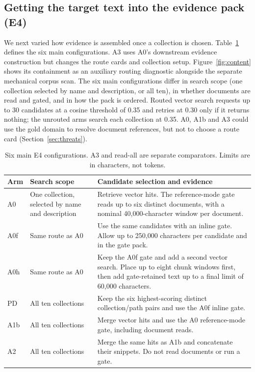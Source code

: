 \subsection{Getting the target text into the evidence pack (E4)}
\label{sec:ladder-opt}
\label{sec:exp-e4}
We next varied how evidence is assembled once a collection is chosen.
Table~\ref{tab:ablation-configs} defines the six main configurations.
A3 uses A0's downstream evidence construction but changes the route cards
and collection setup. Figure~\ref{fig:content} shows its containment as an
auxiliary routing diagnostic alongside the separate mechanical corpus scan.
The six main configurations differ
in search scope (one collection selected by name and description, or all
ten), in whether documents are read and gated, and in how the pack is
ordered. Routed vector search requests up to 30 candidates at a cosine
threshold of 0.35 and retries at 0.30 only if it returns nothing; the
unrouted arms search each collection at 0.35. A0, A1b and A3 could use
the gold domain to resolve document references, but not to choose a route card
(Section~\ref{sec:threats}).

\begin{table}[!ht]
\centering
\small
\setlength{\tabcolsep}{3pt}
\renewcommand{\arraystretch}{1.16}
\caption{Six main E4 configurations. A3 and read-all are separate
comparators. Limits are in characters, not tokens.}
\label{tab:ablation-configs}
\begin{tabular}{@{}l>{\raggedright\arraybackslash}p{}>{\raggedright\arraybackslash}p{}@{}}
\toprule
Arm & Search scope & Candidate selection and evidence\\
\midrule
A0 & One collection, selected by name and description & Retrieve vector hits. The reference-mode gate reads up to six distinct documents, with a nominal 40{,}000-character window per document.\\
A0f & Same route as A0 & Use the same candidates with an inline gate. Allow up to 250{,}000 characters per candidate and in the gate pack.\\
A0h & Same route as A0 & Keep the A0f gate and add a second vector search. Place up to eight chunk windows first, then add gate-retained text up to a final limit of 60{,}000 characters.\\
PD & All ten collections & Keep the six highest-scoring distinct collection/path pairs and use the A0f inline gate.\\
A1b & All ten collections & Merge vector hits and use the A0 reference-mode gate, including document reads.\\
A2 & All ten collections & Merge the same hits as A1b and concatenate their snippets. Do not read documents or run a gate.\\
\bottomrule
\end{tabular}
\end{table}

